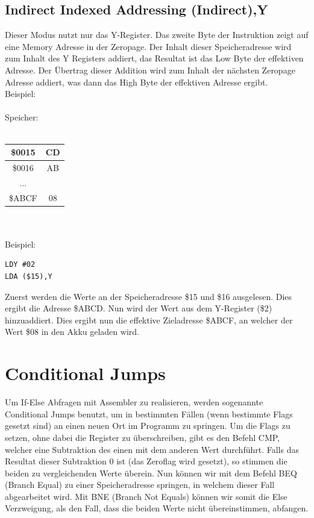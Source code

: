 \documentclass[a4paper,10pt]{report}
\begin{document}
\subsection{Indirect Indexed Addressing (Indirect),Y}
Dieser Modus nutzt nur das Y-Register. Das zweite Byte der Instruktion zeigt auf eine Memory Adresse in der Zeropage. Der Inhalt dieser Speicheradresse wird zum Inhalt des Y Registers addiert, das Resultat ist das Low Byte der effektiven Adresse. Der Übertrag dieser Addition wird zum Inhalt der nächsten Zeropage Adresse addiert, was dann das High Byte der effektiven Adresse ergibt. 
\\
Beispiel:
\\\\Speicher:
\\
\\
\begin{tabular}{|c|c|}
\hline
\$0015 &CD  \\ \hline
\$0016 &AB \\ \hline
... &  \\  \hline 
\$ABCF &08  \\ \hline
\end{tabular}
\\\\
Beispiel:\\
\begin{lstlisting}[]
LDY #02
LDA ($15),Y
\end{lstlisting}
Zuerst werden die Werte an der Speicheradresse \$15 und \$16 ausgelesen. Dies ergibt die Adresse \$ABCD. Nun wird der Wert aus dem Y-Register (\$2) hinzuaddiert. Dies ergibt nun die effektive Zieladresse \$ABCF, an welcher der Wert \$08 in den Akku geladen wird.
\section{Conditional Jumps}
Um If-Else Abfragen mit Assembler zu realisieren, werden sogenannte Conditional Jumps benutzt, um in bestimmten Fällen (wenn bestimmte Flags gesetzt sind) an einen neuen Ort im Programm zu springen.
Um die Flags zu setzen, ohne dabei die Register zu überschreiben, gibt es den Befehl CMP, welcher eine Subtraktion des einen mit dem anderen Wert durchführt. Falls das Resultat dieser Subtraktion 0 ist (das Zeroflag wird gesetzt), so stimmen die beiden zu vergleichenden Werte überein. Nun können wir mit dem Befehl BEQ (Branch Equal) zu einer Speicheradresse springen, in welchem dieser Fall abgearbeitet wird. Mit BNE (Branch Not Equals) können wir somit die Else Verzweigung, als den Fall, dass die beiden Werte nicht übereinstimmen, abfangen.
\end{document}
